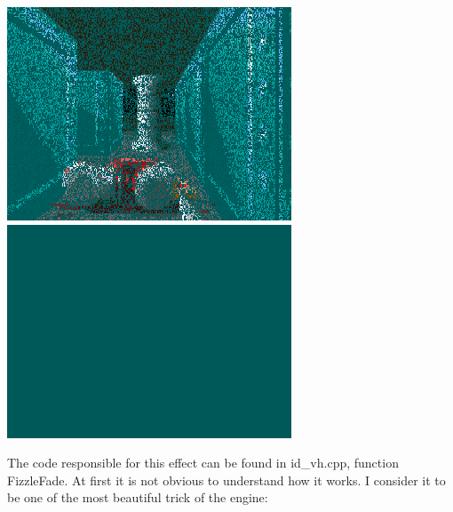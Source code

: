\begin{minipage}{\textwidth}
\centering
  \includegraphics[width=.9\textwidth]{imgs/fizzlefade/boss/screenshot_102.png}\\
\vspace*{0.5cm}
  \includegraphics[width=.9\textwidth]{imgs/fizzlefade/boss/screenshot_130.png}\\
\end{minipage}


The code responsible for this effect can be found in id\_vh.cpp, function FizzleFade. At first it is not obvious to understand how it works. I consider it to be one of the most beautiful trick of the engine:\\
\par
\begin{minipage}{\textwidth}

\end{minipage}
\par
        
